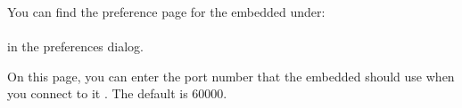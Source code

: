 \label{TasksPrefsEmbeddedAgent}

You can find the preference page for the embedded \gdagent{} under:\\
\\
in the preferences dialog.

On this page, you can enter the port number that the embedded \gdagent{}  should use when you connect to it . The default is 60000.


